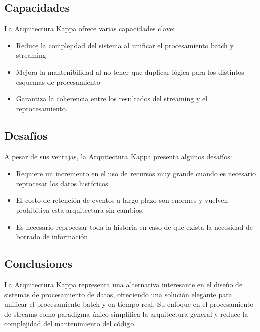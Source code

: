 \subsection{Capacidades}
La Arquitectura Kappa ofrece varias capacidades clave:
\begin{itemize}
    \item Reduce la complejidad del sistema al unificar el procesamiento batch y streaming
    \item Mejora la mantenibilidad al no tener que duplicar lógica para los distintos esquemas de procesamiento
    \item Garantiza la coherencia entre los resultados del streaming y el reprocesamiento.
\end{itemize}

\newpage
\subsection{Desafíos}
A pesar de sus ventajas, la Arquitectura Kappa presenta algunos desafíos:
\begin{itemize}
    \item Requiere un incremento en el uso de recursos muy grande cuando es necesario reprocesar los datos históricos.
    \item El costo de retención de eventos a largo plazo son enormes y vuelven prohibitiva esta arquitectura sin cambios.
    \item Es necesario reprocesar toda la historia en caso de que exista la necesidad de borrado de información
\end{itemize}

\subsection{Conclusiones}
La Arquitectura Kappa representa una alternativa interesante en el diseño de sistemas de procesamiento de datos, 
ofreciendo una solución elegante para unificar el procesamiento batch y en tiempo real. 
Su enfoque en el procesamiento de streams como paradigma único simplifica la arquitectura general y reduce la complejidad del mantenimiento del código.
\newpage